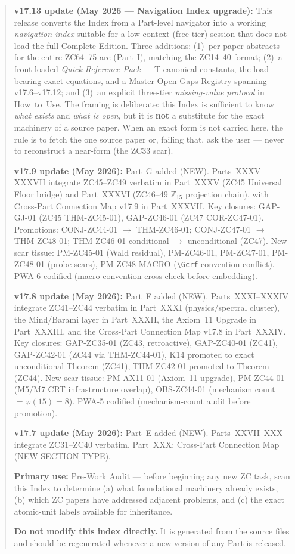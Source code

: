 \documentclass[11pt, a4paper]{article}
\begin{document}
\begin{abstract}
\textbf{v17.13 update (May 2026 --- Navigation Index upgrade):}
This release converts the Index from a Part-level navigator into a
working \emph{navigation index} suitable for a low-context (free-tier)
session that does not load the full Complete Edition. Three additions:
(1)~per-paper abstracts for the entire ZC64--75 arc (Part~I), matching
the ZC14--40 format; (2)~a front-loaded \emph{Quick-Reference Pack} ---
T-canonical constants, the load-bearing exact equations, and a Master
Open Gaps Registry spanning v17.6--v17.12; and (3)~an explicit
three-tier \emph{missing-value protocol} in How~to~Use. The framing is
deliberate: this Index is sufficient to know \emph{what exists} and
\emph{what is open}, but it is \textbf{not} a substitute for the exact
machinery of a source paper. When an exact form is not carried here,
the rule is to fetch the one source paper or, failing that, ask the
user --- never to reconstruct a near-form (the ZC33 scar).

\textbf{v17.9 update (May 2026):}
Part~G added (NEW). Parts~XXXV--XXXVII integrate ZC45--ZC49
verbatim in Part~XXXV (ZC45 Universal Floor bridge) and
Part~XXXVI (ZC46--49 $\mathbb{Z}_{15}$ projection chain), with
Cross-Part Connection Map v17.9 in Part~XXXVII.
Key closures: GAP-GJ-01 (ZC45 THM-ZC45-01), GAP-ZC46-01
(ZC47 COR-ZC47-01).
Promotions: CONJ-ZC44-01 $\to$ THM-ZC46-01; CONJ-ZC47-01 $\to$
THM-ZC48-01; THM-ZC46-01 conditional $\to$ unconditional (ZC47).
New scar tissue: PM-ZC45-01 (Wald residual), PM-ZC46-01,
PM-ZC47-01, PM-ZC48-01 (probe scars), PM-ZC48-MACRO
(\texttt{\textbackslash Gcrf} convention conflict). PWA-6 codified
(macro convention cross-check before embedding).

\textbf{v17.8 update (May 2026):}
Part~F added (NEW). Parts~XXXI--XXXIV integrate ZC41--ZC44
verbatim in Part~XXXI (physics/spectral cluster), the Mind/Barami
layer in Part~XXXII, the Axiom~11 Upgrade in Part~XXXIII, and the
Cross-Part Connection Map v17.8 in Part~XXXIV.
Key closures: GAP-ZC35-01 (ZC43, retroactive), GAP-ZC40-01 (ZC41),
GAP-ZC42-01 (ZC44 via THM-ZC44-01), K14 promoted to exact
unconditional Theorem (ZC41), THM-ZC42-01 promoted to Theorem (ZC44).
New scar tissue: PM-AX11-01 (Axiom~11 upgrade), PM-ZC44-01
(M5/M7 CRT infrastructure overlap), OBS-ZC44-01 (mechanism count
$= \varphi(15) = 8$). PWA-5 codified (mechanism-count audit
before promotion).

\textbf{v17.7 update (May 2026):}
Part~E added (NEW). Parts~XXVII--XXX integrate ZC31--ZC40 verbatim.
Part~XXX: Cross-Part Connection Map (NEW SECTION TYPE).

\textbf{Primary use:} Pre-Work Audit --- before beginning any new
ZC task, scan this Index to determine (a) what foundational machinery
already exists, (b) which ZC papers have addressed adjacent problems,
and (c) the exact atomic-unit labels available for inheritance.

\textbf{Do not modify this index directly.} It is generated from the
source files and should be regenerated whenever a new version of any
Part is released.
\end{abstract}
\end{document}
